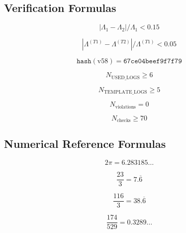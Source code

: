 \documentclass[11pt,a4paper]{article}
\theoremstyle{definition}
\begin{document}
\subsection{Verification Formulas}
\label{subsec:cat-verify}

\begin{equation}
\label{eq:cat-47}
|\Lambda_1 - \Lambda_2|/\Lambda_1 < 0.15
\end{equation}

\begin{equation}
\label{eq:cat-48}
|\Lambda^{(T1)} - \Lambda^{(T2)}|/\Lambda^{(T1)} < 0.05
\end{equation}

\begin{equation}
\label{eq:cat-49}
\texttt{hash}(\text{v58}) = \texttt{67ce04beef9f7f79}
\end{equation}

\begin{equation}
\label{eq:cat-50}
N_{\text{USED\_LOGS}} \geq 6
\end{equation}

\begin{equation}
\label{eq:cat-51}
N_{\text{TEMPLATE\_LOGS}} \geq 5
\end{equation}

\begin{equation}
\label{eq:cat-52}
N_{\text{violations}} = 0
\end{equation}

\begin{equation}
\label{eq:cat-53}
N_{\text{checks}} \geq 70
\end{equation}

\subsection{Numerical Reference Formulas}
\label{subsec:cat-num}

\begin{equation}
\label{eq:cat-54}
2\pi = 6.283185\ldots
\end{equation}

\begin{equation}
\label{eq:cat-55}
\frac{23}{3} = 7.\overline{6}
\end{equation}

\begin{equation}
\label{eq:cat-56}
\frac{116}{3} = 38.\overline{6}
\end{equation}

\begin{equation}
\label{eq:cat-57}
\frac{174}{529} = 0.3289\ldots
\end{equation}
\end{document}
